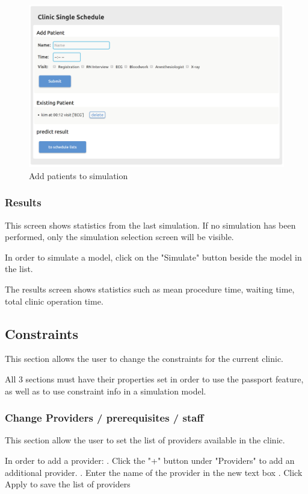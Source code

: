 \documentclass[12pt]{article}
\begin{document}
\begin{figure}[h!]
\caption{Add patients to simulation}
\centering
\includegraphics[width=\textwidth]{sim}
\end{figure}

\subsubsection{Results}
This screen shows statistics from the last simulation. If no simulation has been performed, only the simulation selection screen will be visible.
\medbreak

In order to simulate a model, click on the "Simulate" button beside the model in the list.
\medbreak

The results screen shows statistics such as mean procedure time, waiting time, total clinic operation time.

\subsection{Constraints}
This section allows the user to change the constraints for the current clinic.
\medbreak

All 3 sections must have their properties set in order to use the passport feature, as well as to use constraint info in a simulation model.

\subsubsection{Change Providers / prerequisites / staff}
This section allow the user to set the list of providers available in the clinic.
\medbreak

In order to add a provider:
. Click the "+" button under "Providers" to add an additional provider.
. Enter the name of the provider in the new text box
. Click Apply to save the list of providers
\medbreak
\end{document}
